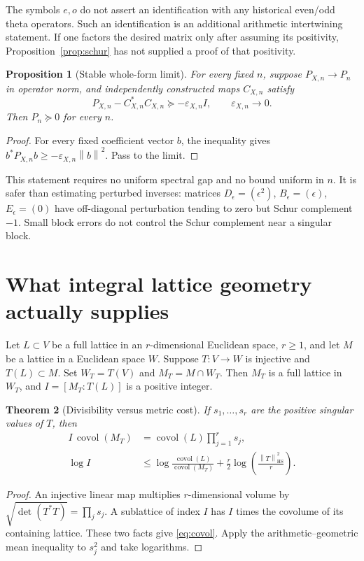 \documentclass[11pt,letterpaper]{article}
\newtheorem{theorem}{Theorem}[section]
\newtheorem{proposition}[theorem]{Proposition}
\theoremstyle{definition}
\theoremstyle{remark}
\newcommand{\covol}{\operatorname{covol}}
\newcommand{\HS}{\mathrm{HS}}
\newcommand{\norm}[1]{\left\lVert#1\right\rVert}
\numberwithin{equation}{section}
\begin{document}
The symbols $e,o$ do not assert an identification with any historical even/odd theta operators. Such an identification is an additional arithmetic intertwining statement. If one factors the desired matrix only after assuming its positivity, Proposition~\ref{prop:schur} has not supplied a proof of that positivity.

\begin{proposition}[Stable whole-form limit]\label{prop:limit}
For every fixed $n$, suppose $P_{X,n}\to P_n$ in operator norm, and independently constructed maps $C_{X,n}$ satisfy
\[
 P_{X,n}-C_{X,n}^*C_{X,n}\succeq-\varepsilon_{X,n}I,
 \qquad\varepsilon_{X,n}\to0.
\]
Then $P_n\succeq0$ for every $n$.
\end{proposition}
\begin{proof}
For every fixed coefficient vector $b$, the inequality gives
$b^*P_{X,n}b\ge-\varepsilon_{X,n}\norm b^2$. Pass to the limit.
\end{proof}

This statement requires no uniform spectral gap and no bound uniform in $n$. It is safer than estimating perturbed inverses: matrices $D_\epsilon=(\epsilon^2)$, $B_\epsilon=(\epsilon)$, $E_\epsilon=(0)$ have off-diagonal perturbation tending to zero but Schur complement $-1$. Small block errors do not control the Schur complement near a singular block.

\section{What integral lattice geometry actually supplies}

Let $L\subset V$ be a full lattice in an $r$-dimensional Euclidean space, $r\ge1$, and let $M$ be a lattice in a Euclidean space $W$. Suppose $T:V\to W$ is injective and $T(L)\subset M$. Set $W_T=T(V)$ and $M_T=M\cap W_T$. Then $M_T$ is a full lattice in $W_T$, and $I=[M_T:T(L)]$ is a positive integer.

\begin{theorem}[Divisibility versus metric cost]\label{thm:lattice}
If $s_1,\ldots,s_r$ are the positive singular values of $T$, then
\begin{align}
 I\,\covol(M_T)&=\covol(L)\prod_{j=1}^rs_j,\label{eq:covol}\\
 \log I&\le\log\frac{\covol(L)}{\covol(M_T)}
 +\frac r2\log\left(\frac{\norm T_{\HS}^2}{r}\right).\label{eq:cost}
\end{align}
\end{theorem}
\begin{proof}
An injective linear map multiplies $r$-dimensional volume by $\sqrt{\det(T^*T)}=\prod_js_j$. A sublattice of index $I$ has $I$ times the covolume of its containing lattice. These two facts give \eqref{eq:covol}. Apply the arithmetic--geometric mean inequality to $s_j^2$ and take logarithms.
\end{proof}
\end{document}
